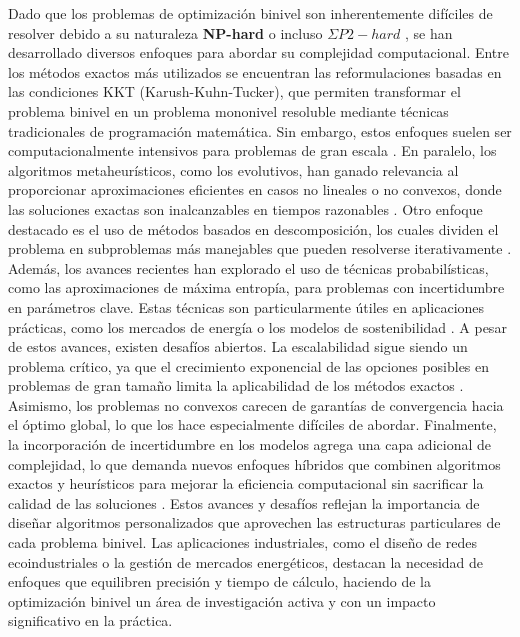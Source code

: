 Dado que los problemas de optimización binivel son inherentemente difíciles de resolver debido a su naturaleza \textbf{NP-hard} \cite{Jeroslow1985ThePHNP,jonathan_f__bard_1991NP}
o incluso $\Sigma P2-hard$ \cite{phdthesisCerulli,DempeyZemkoho2020},
se han desarrollado diversos enfoques para abordar su complejidad computacional. Entre los métodos exactos más utilizados se encuentran las reformulaciones basadas en las condiciones KKT (Karush-Kuhn-Tucker), que permiten transformar el problema binivel en un problema mononivel resoluble mediante técnicas tradicionales de programación matemática.
Sin embargo, estos enfoques suelen ser computacionalmente intensivos para problemas de gran escala \cite{phdthesisCerulli}.
En paralelo, los algoritmos metaheurísticos, como los evolutivos, han ganado relevancia al proporcionar aproximaciones eficientes en casos no lineales o no convexos, donde las soluciones exactas son inalcanzables en tiempos razonables \cite{Sinha2017ARO}.
Otro enfoque destacado es el uso de métodos basados en descomposición, los cuales dividen el problema en subproblemas más manejables que pueden resolverse iterativamente \cite{Floudas1990ACO}.
Además, los avances recientes han explorado el uso de técnicas probabilísticas, como las aproximaciones de máxima entropía, para problemas con incertidumbre en parámetros clave.
Estas técnicas son particularmente útiles en aplicaciones prácticas, como los mercados de energía o los modelos de sostenibilidad \cite{SadddiquiNaturalGasSOS1}.
A pesar de estos avances, existen desafíos abiertos. La escalabilidad sigue siendo un problema crítico, ya que el crecimiento exponencial de las opciones posibles en problemas de gran tamaño limita la aplicabilidad de los métodos exactos \cite{DempeyZemkoho2020}.
Asimismo, los problemas no convexos carecen de garantías de convergencia hacia el óptimo global, lo que los hace especialmente difíciles de abordar. Finalmente, la incorporación de incertidumbre en los modelos agrega una capa adicional de complejidad, lo que demanda nuevos enfoques híbridos que combinen algoritmos exactos y heurísticos para mejorar la eficiencia computacional sin sacrificar la calidad de las soluciones \cite{phdthesisCerulli,Sinha2017ARO}. Estos avances y desafíos reflejan la importancia de diseñar algoritmos personalizados que aprovechen las estructuras particulares de cada problema binivel. Las aplicaciones industriales, como el diseño de redes ecoindustriales o la gestión de mercados energéticos, destacan la necesidad de enfoques que equilibren precisión y tiempo de cálculo, haciendo de la optimización binivel un área de investigación activa y con un impacto significativo en la práctica.

